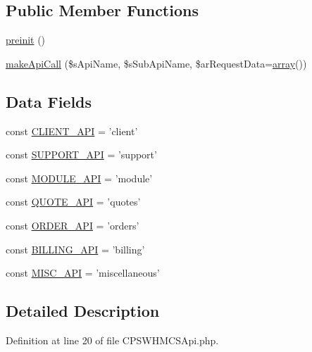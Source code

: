 \subsection*{Public Member Functions}
\begin{DoxyCompactItemize}
\item 
\hyperlink{classCPSWHMCSApi_a2dc262e99b1c246b56f27626bfe699ff}{preinit} ()
\item 
\hyperlink{classCPSWHMCSApi_a0270d3c5c68d48cd7705bd8cb532b585}{makeApiCall} (\$sApiName, \$sSubApiName, \$arRequestData=\hyperlink{list_8php_aa3205d038c7f8feb5c9f01ac4dfadc88}{array}())
\end{DoxyCompactItemize}
\subsection*{Data Fields}
\begin{DoxyCompactItemize}
\item 
const \hyperlink{classCPSWHMCSApi_a4cd3e96565485f7e9109773d8ab6de40}{CLIENT\_\-API} = 'client'
\item 
const \hyperlink{classCPSWHMCSApi_ad43172e74f8477298850651b0cca3a5e}{SUPPORT\_\-API} = 'support'
\item 
const \hyperlink{classCPSWHMCSApi_a72067cda85b4e918f4fe3a1292227879}{MODULE\_\-API} = 'module'
\item 
const \hyperlink{classCPSWHMCSApi_a36cc0ed56cc1893b22c3d8578b23ee9b}{QUOTE\_\-API} = 'quotes'
\item 
const \hyperlink{classCPSWHMCSApi_a550795e231e81e5688a95f44c6495d81}{ORDER\_\-API} = 'orders'
\item 
const \hyperlink{classCPSWHMCSApi_a9580b89431cd08a4216a20b1ef9cbcfa}{BILLING\_\-API} = 'billing'
\item 
const \hyperlink{classCPSWHMCSApi_ae5f7cfe2a796124746ddb5ce917c1043}{MISC\_\-API} = 'miscellaneous'
\end{DoxyCompactItemize}


\subsection{Detailed Description}


Definition at line 20 of file CPSWHMCSApi.php.



